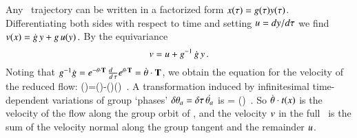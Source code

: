 



Any \statesp\ trajectory can be written in a factorized
form $x(\tau)=g(\tau)
y(\tau)$. Differentiating both sides with respect to time and
setting $u={dy}/{d\tau}$ we find
\(
v(x)=\dot{g} \, y+g \, u(y)
\,.
\)
By the equivariance 
\[
v=u + g^{-1} \, \dot{g} \, y
\,.
\]
Noting that $g^{-1}\dot{g}=e^{-{\bf \theta} \cdot \mathbf{T}} \,
\frac{d ~~}{d \, \tau} e^{{\bf \theta} \cdot \mathbf{T}}=\dot{{\bf \theta}}\cdot \mathbf{T}$,
we obtain the equation for the velocity of the reduced flow:
\beq
\velRed(\sspRed)=\vel(\sspRed)-\dot{\gSpace}(\sspRed)\cdot \groupTan(\sspRed)
\,.
A transformation induced by infinitesimal
time-dependent variations  of group `phases'
$\delta {\bf \theta}_a = {\delta \tau} \, \dot{{\bf \theta}_a}$ is
\beq
\dot{\ssp} = \dot{\gSpace} \cdot \groupTan(\ssp)
\,.
So $\dot{{\bf \theta}} \cdot t(x)$ is the velocity
of the flow along the group orbit of \ssp, and
the velocity $v$ in the full \statesp\ is the sum of
the velocity normal along the group tangent and the remainder $u$.

